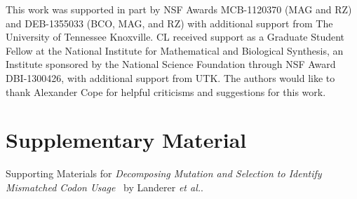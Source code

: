 \documentclass[fleqn,letterpaper]{article}
\newcommand\suppl{\par
  \setcounter{section}{0}%
  \setcounter{subsection}{0}%
  \setcounter{table}{0}%
  \setcounter{figure}{0}%
  \setcounter{equation}{0}%
  \gdef\thesection{\Alph{section}.1}%
  \def\thefigure{\Alph{section}\arabic{figure}}%
  \def\thetable{\Alph{section}\arabic{table}}%
  \def\theequation {\Alph{section}\arabic{equation}}}
\begin{document}
This work was supported in part by NSF Awards MCB-1120370 (MAG and RZ) and DEB-1355033 (BCO, MAG, and RZ) with additional support from The University of Tennessee Knoxville. 
CL received support as a Graduate Student Fellow at the National Institute for Mathematical and Biological Synthesis, an Institute sponsored by the National Science Foundation through NSF Award DBI-1300426, with additional support from UTK. 
The authors would like to thank Alexander Cope for helpful criticisms and suggestions for this work.






\clearpage
\pagebreak



\suppl

\setcounter{section}{19} %
\setcounter{page}{1}
\renewcommand{\thepage}{S\arabic{page}} %

\section*{Supplementary Material}

Supporting Materials for \emph{Decomposing Mutation and Selection to Identify Mismatched Codon Usage} \ by Landerer \emph{et al.}.
\end{document}

